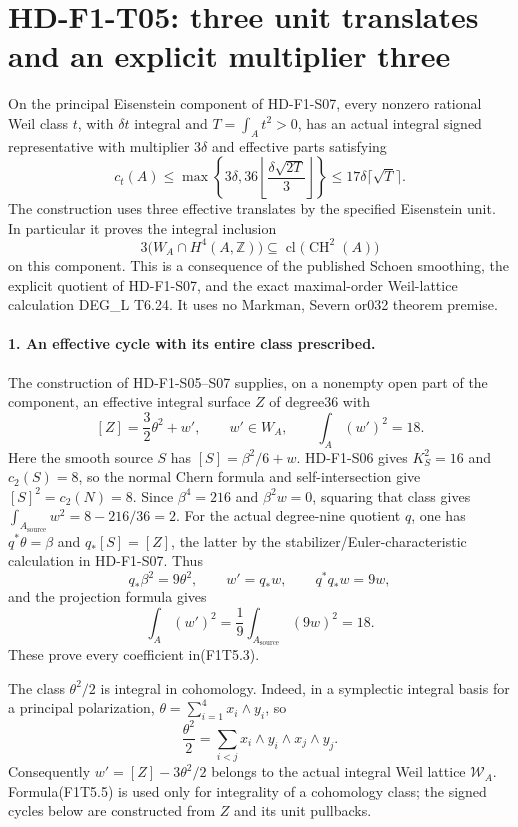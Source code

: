 \section{HD-F1-T05: three unit translates and an explicit multiplier three}
\label{sec:f1-exact-division}

On the principal Eisenstein component of HD-F1-S07, every nonzero
rational Weil class $t$, with $\delta t$ integral and
$T=\int_A t^2>0$, has an actual integral signed representative
with multiplier $3\delta$ and effective parts satisfying
\[
 \boxed{c_t(A)\le
 \max\left\{3\delta,
       36\left\lfloor\frac{\delta\sqrt{2T}}3\right\rfloor\right\}
       \le17\delta\lceil\sqrt T\rceil.}
 \tag{F1T5.1}
\]
The construction uses three effective translates by the specified
Eisenstein unit. In particular it proves the integral inclusion
\[
 3\bigl(W_A\cap H^4(A,\mathbb Z)\bigr)
       \subseteq\operatorname{cl}\bigl(\operatorname{CH}^2(A)\bigr)
 \tag{F1T5.2}
\]
on this component. This is a consequence of the published Schoen
smoothing, the explicit quotient of HD-F1-S07, and the exact
maximal-order Weil-lattice calculation DEG\_L T6.24. It uses no
Markman, Severn or032 theorem premise.

\paragraph{1. An effective cycle with its entire class prescribed.}
The construction of HD-F1-S05--S07 supplies, on a nonempty open
part of the component, an effective integral surface $Z$ of
degree36 with
\[
 [Z]=\frac32\theta^2+w',\qquad
       w'\in W_A,\qquad \int_A(w')^2=18.
 \tag{F1T5.3}
\]
Here the smooth source $S$ has $[S]=\beta^2/6+w$.
HD-F1-S06 gives $K_S^2=16$ and $c_2(S)=8$, so the normal
Chern formula and self-intersection give $[S]^2=c_2(N)=8$.
Since $\beta^4=216$ and $\beta^2w=0$, squaring that class
gives $\int_{A_{\mathrm{source}}}w^2=8-216/36=2$.
For the actual degree-nine
quotient $q$, one has $q^*\theta=\beta$ and
$q_*[S]=[Z]$, the latter by the stabilizer/Euler-characteristic
calculation in HD-F1-S07. Thus
\[
 q_*\beta^2=9\theta^2,\qquad w'=q_*w,\qquad
 q^*q_*w=9w,
\]
and the projection formula gives
\[
 \int_A(w')^2
       =\frac19\int_{A_{\mathrm{source}}}(9w)^2=18.
 \tag{F1T5.4}
\]
These prove every coefficient in(F1T5.3).

The class $\theta^2/2$ is integral in cohomology. Indeed, in a
symplectic integral basis for a principal polarization,
$\theta=\sum_{i=1}^4x_i\wedge y_i$, so
\[
 \frac{\theta^2}2=\sum_{i<j}
                    x_i\wedge y_i\wedge x_j\wedge y_j.
 \tag{F1T5.5}
\]
Consequently $w'=[Z]-3\theta^2/2$ belongs to the actual integral
Weil lattice $\mathscr W_A$. Formula(F1T5.5) is used only for
integrality of a cohomology class; the signed cycles below are
constructed from $Z$ and its unit pullbacks.

